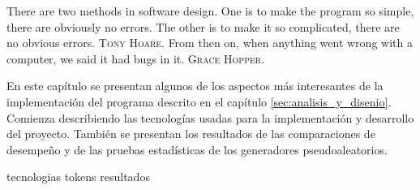 %
%
%

{
  \epigrafe
  {%
    There are two methods in software design. One is to make the program so
    simple, there are obviously no errors. The other is to make it so
    complicated, there are no obvious errors.%
  }
  {%
    \textsc{Tony Hoare}.%
  }
  \epigrafe
  {%
    From then on, when anything went wrong with a computer, we said it had bugs
    in it.%
  }
  {%
     \textsc{Grace Hopper}.%
  }
}

\noindent
En este capítulo se presentan algunos de los aspectos más interesantes de
la implementación del programa descrito en el capítulo
\ref{sec:analisis_y_disenio}. Comienza describiendo las tecnologías
usadas para la implementación y desarrollo del proyecto. También se presentan
los resultados de las comparaciones de desempeño y de las pruebas estadísticas
de los generadores pseudoaleatorios.

{tecnologias}
{tokens}
{resultados}
